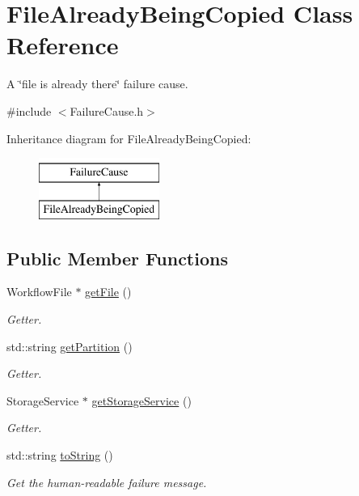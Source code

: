 \hypertarget{class_file_already_being_copied}{}\section{File\+Already\+Being\+Copied Class Reference}
\label{class_file_already_being_copied}


A \char`\"{}file is already there\char`\"{} failure cause.  




{\ttfamily \#include $<$Failure\+Cause.\+h$>$}

Inheritance diagram for File\+Already\+Being\+Copied\+:\begin{figure}[H]
\begin{center}
\leavevmode
\includegraphics[height=2.000000cm]{class_file_already_being_copied}
\end{center}
\end{figure}
\subsection*{Public Member Functions}
\begin{DoxyCompactItemize}
\item 
Workflow\+File $\ast$ \hyperlink{class_file_already_being_copied_a8c6056a114a9dced95b3d18279fd84b7}{get\+File} ()
\begin{DoxyCompactList}\small\item\em Getter. \end{DoxyCompactList}\item 
std\+::string \hyperlink{class_file_already_being_copied_ab0edc31e09650460c6a04b5ea9e656ac}{get\+Partition} ()
\begin{DoxyCompactList}\small\item\em Getter. \end{DoxyCompactList}\item 
Storage\+Service $\ast$ \hyperlink{class_file_already_being_copied_aadf9994fec4902b1abdd42c3e37c29bd}{get\+Storage\+Service} ()
\begin{DoxyCompactList}\small\item\em Getter. \end{DoxyCompactList}\item 
std\+::string \hyperlink{class_file_already_being_copied_a2d1a19d14abd21b3e47d36264cf367a8}{to\+String} ()
\begin{DoxyCompactList}\small\item\em Get the human-\/readable failure message. \end{DoxyCompactList}\end{DoxyCompactItemize}


